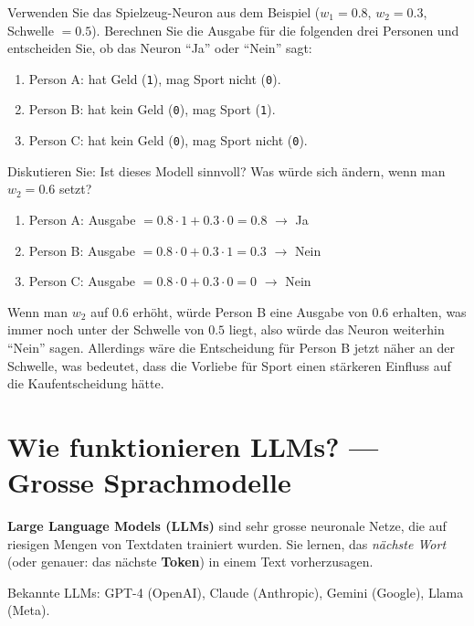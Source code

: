 \begin{myexercise}
Verwenden Sie das Spielzeug-Neuron aus dem Beispiel ($w_1 = 0.8$, $w_2 = 0.3$,
Schwelle $= 0.5$). Berechnen Sie die Ausgabe für die folgenden drei Personen und
entscheiden Sie, ob das Neuron \enquote{Ja} oder \enquote{Nein} sagt:

\begin{enumerate}
    \item Person A: hat Geld (\texttt{1}), mag Sport nicht (\texttt{0}).
    \item Person B: hat kein Geld (\texttt{0}), mag Sport (\texttt{1}).
    \item Person C: hat kein Geld (\texttt{0}), mag Sport nicht (\texttt{0}).
\end{enumerate}

Diskutieren Sie: Ist dieses Modell sinnvoll? Was würde sich ändern, wenn man
$w_2 = 0.6$ setzt?
\begin{myanswer}
\begin{enumerate}
    \item Person A: Ausgabe $= 0.8 \cdot 1 + 0.3 \cdot 0 = 0.8$ $\rightarrow$ Ja
    \item Person B: Ausgabe $= 0.8 \cdot 0 + 0.3 \cdot 1 = 0.3$ $\rightarrow$ Nein
    \item Person C: Ausgabe $= 0.8 \cdot 0 + 0.3 \cdot 0 = 0$ $\rightarrow$ Nein
\end{enumerate}
Wenn man $w_2$ auf 0.6 erhöht, würde Person B eine Ausgabe von $0.6$ erhalten, was immer noch unter der Schwelle von $0.5$ liegt, also würde das Neuron weiterhin \enquote{Nein} sagen. Allerdings wäre die Entscheidung für Person B jetzt näher an der Schwelle, was bedeutet, dass die Vorliebe für Sport einen stärkeren Einfluss auf die Kaufentscheidung hätte.
\end{myanswer}
\end{myexercise}

\section{Wie funktionieren LLMs? --- Grosse Sprachmodelle}

\begin{mydefinition}
\textbf{Large Language Models (LLMs)} sind sehr grosse neuronale Netze, die auf
riesigen Mengen von Textdaten trainiert wurden. Sie lernen, das \emph{nächste Wort}
(oder genauer: das nächste \textbf{Token}) in einem Text vorherzusagen.

Bekannte LLMs: GPT-4 (OpenAI), Claude (Anthropic), Gemini (Google), Llama (Meta).
\end{mydefinition}

